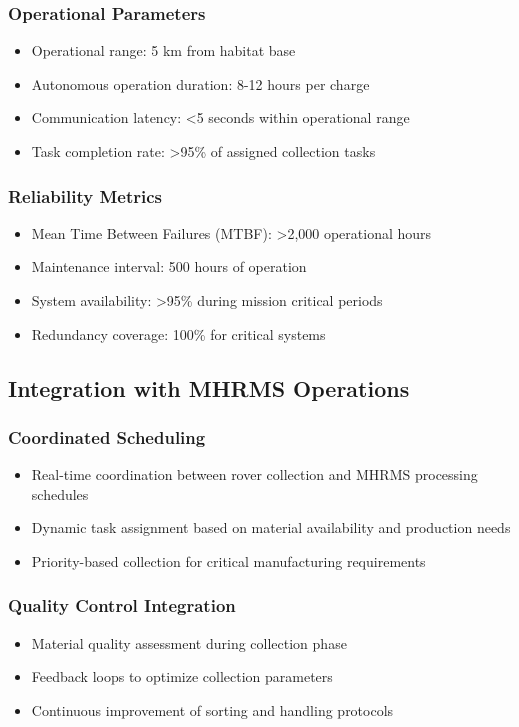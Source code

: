 \documentclass[12pt, a4paper]{article}
\begin{document}
\subsubsection{Operational Parameters}
\begin{itemize}
    \item Operational range: 5 km from habitat base
    \item Autonomous operation duration: 8-12 hours per charge
    \item Communication latency: <5 seconds within operational range
    \item Task completion rate: >95\% of assigned collection tasks
\end{itemize}

\subsubsection{Reliability Metrics}
\begin{itemize}
    \item Mean Time Between Failures (MTBF): >2,000 operational hours
    \item Maintenance interval: 500 hours of operation
    \item System availability: >95\% during mission critical periods
    \item Redundancy coverage: 100\% for critical systems
\end{itemize}

\subsection{Integration with MHRMS Operations}

\subsubsection{Coordinated Scheduling}
\begin{itemize}
    \item Real-time coordination between rover collection and MHRMS processing schedules
    \item Dynamic task assignment based on material availability and production needs
    \item Priority-based collection for critical manufacturing requirements
\end{itemize}

\subsubsection{Quality Control Integration}
\begin{itemize}
    \item Material quality assessment during collection phase
    \item Feedback loops to optimize collection parameters
    \item Continuous improvement of sorting and handling protocols
\end{itemize}
\end{document}
